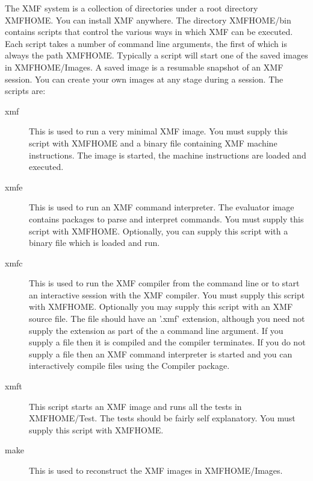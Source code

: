 \documentclass[a4paper]{article}
\begin{document}
The XMF system is a collection of directories under a root directory XMFHOME. You
can install XMF anywhere. The directory XMFHOME/bin contains scripts that control
the various ways in which XMF can be executed. Each script takes a number of command
line arguments, the first of which is always the path XMFHOME. Typically a script 
will start one of the saved images in XMFHOME/Images. A saved image is a resumable
snapshot of an XMF session. You can create your own images at any stage during a
session. The scripts are:
\begin{description}
\item[xmf] This is used to run a very minimal XMF image. You must
supply this script with XMFHOME and a binary file containing XMF machine instructions.
The image is started, the machine instructions are loaded and executed.
\item[xmfe] This is used to run an XMF command interpreter. The evaluator image
contains packages to parse and interpret commands. You must supply this
script with XMFHOME. Optionally, you can supply this script with a binary file
which is loaded and run.
\item[xmfc] This is used to run the XMF compiler from the command line or to
start an interactive session with the XMF compiler. You must supply this
script with XMFHOME. Optionally you may supply this script with an XMF
source file. The file should have an '.xmf' extension, although you need
not supply the extension as part of the a command line argument. If you supply
a file then it is compiled and the compiler terminates. If you do not supply a file
then an XMF command interpreter is started and you can interactively compile files
using the Compiler package.
\item[xmft] This script starts an XMF image and runs all the tests in
XMFHOME/Test. The tests should be fairly self explanatory. You must supply this
script with XMFHOME.
\item[make] This is used to reconstruct the XMF images in XMFHOME/Images.
\end{description}


\end{document}
